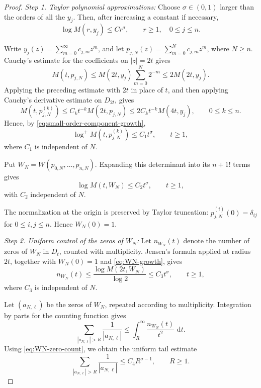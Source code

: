 \documentclass[12pt,letterpaper,reqno]{amsart}
\theoremstyle{definition}
\numberwithin{equation}{section}
\newcommand{\dd}{\,\mathrm d}
\begin{document}
\begin{proof}

\medskip\noindent
\emph{{Step 1. Taylor polynomial approximations:}}
Choose \(\sigma\in(0,1)\) larger than the orders of all the
\(y_j\). Then, after increasing a constant if necessary,
\begin{equation}\label{eq:small-order-component-growth}
 \log M(r,y_j)\leq C r^\sigma,
 \qquad
 r\geq1,\quad 0\leq j\leq n.
\end{equation}

Write \(y_j(z)=\sum_{m=0}^\infty c_{j,m}z^m\), and let
\(p_{j,N}(z)=\sum_{m=0}^Nc_{j,m}z^m\), where \(N\geq n\).
Cauchy's estimate for the coefficients on \(|z|=2t\) gives
\[
 M(t,p_{j,N})
 \leq
 M(2t,y_j)\sum_{m=0}^N2^{-m}
 \leq
 2M(2t,y_j).
\]
Applying the preceding estimate with \(2t\) in place of \(t\), and
then applying Cauchy's derivative estimate on \(D_{2t}\), gives
\[
 M(t,p_{j,N}^{(k)})
 \leq
 C_k t^{-k}M(2t,p_{j,N})
 \leq
 2C_k t^{-k}M(4t,y_j),
 \qquad 0\leq k\leq n.
\]
Hence, by \eqref{eq:small-order-component-growth},
\[
 \log^+M(t,p_{j,N}^{(k)})
 \leq C_1t^\sigma,
 \qquad t\geq1,
\]
where \(C_1\) is independent of \(N\).

Put
\(W_N=W(p_{0,N},\ldots,p_{n,N})\).
Expanding this determinant into its \({n+1}!\) terms gives
\begin{equation}\label{eq:WN-growth}
 \log M(t,W_N)\leq C_2t^\sigma,
 \qquad
 t\geq1,
\end{equation}
with \(C_2\) independent of \(N\).

The normalization at the origin is preserved by Taylor truncation:
\(p_{j,N}^{(i)}(0)=\delta_{ij}\) for
\(0\leq i,j\leq n\). Hence \(W_N(0)=1\).


\medskip\noindent
\emph{{Step 2. Uniform control of the zeros of \(W_N\):}}
Let \(n_{W_N}(t)\) denote the number of zeros of \(W_N\) in \(D_t\),
counted with multiplicity. Jensen's formula applied at radius \(2t\),
together with \(W_N(0)=1\) and \eqref{eq:WN-growth}, gives
\begin{equation}\label{eq:WN-zero-count}
 n_{W_N}(t)
 \leq
 \frac{\log M(2t,W_N)}{\log2}
 \leq
 C_3t^\sigma,
 \qquad
 t\geq1,
\end{equation}
where \(C_3\) is independent of \(N\).

Let \((a_{N,\ell})\) be the zeros of \(W_N\), repeated according to
multiplicity. Integration by parts for the counting function gives
\[
 \sum_{|a_{N,\ell}|>R}\frac1{|a_{N,\ell}|}
 \leq
 \int_R^\infty
 \frac{n_{W_N}(t)}{t^2}\,\dd t.
\]
Using \eqref{eq:WN-zero-count}, we obtain the uniform tail estimate
\begin{equation}\label{eq:reciprocal-tail}
 \sum_{|a_{N,\ell}|>R}\frac1{|a_{N,\ell}|}
 \leq
 C_4R^{\sigma-1},
 \qquad
 R\geq1.
\end{equation}



\end{proof}
\end{document}
